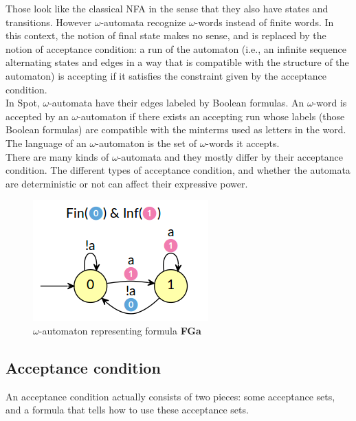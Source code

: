 Those look like the classical NFA in the sense that they also have states and transitions. However
$\omega$-automata recognize $\omega$-words instead of finite words. In this context, the notion of final
state makes no sense, and is replaced by the notion of acceptance condition: a run of the automaton
(i.e., an infinite sequence alternating states and edges in a way that is compatible with the structure of
the automaton) is accepting if it satisfies the constraint given by the acceptance condition.\\

In Spot, $\omega$-automata have their edges labeled by Boolean formulas. An $\omega$-word is accepted by an
$\omega$-automaton if there exists an accepting run whose labels (those Boolean formulas) are compatible
with the minterms \cite{11} used as letters in the word.\\

The language of an $\omega$-automaton is the set of $\omega$-words it accepts.\\

There are many kinds of $\omega$-automata and they mostly differ by their acceptance condition. The
different types of acceptance condition, and whether the automata are deterministic or not can affect their
expressive power.

\begin{figure}[H]
 \centering
 \includegraphics[scale=0.8]{img/omega_aut.png}
 \caption{$\omega$-automaton representing formula \textbf{FGa}}
 \label{fig:omega_aut}
\end{figure}

\subsection{Acceptance condition}
An acceptance condition actually consists of two pieces: some acceptance sets, and a formula that tells
how to use these acceptance sets.\\

